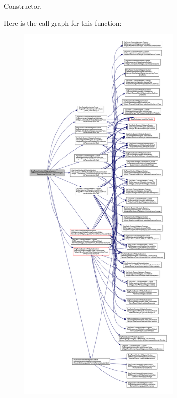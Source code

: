 \begin{DoxyVerb}Constructor.\end{DoxyVerb}
 Here is the call graph for this function\+:
\nopagebreak
\begin{figure}[H]
\begin{center}
\leavevmode
\includegraphics[height=550pt]{class_dsg_tools_1_1_custom_widgets_1_1_custom_db_management_widgets_1_1new_domain_widget_1_1_new_domain_widget_a44731719f99462b989f6d3872b9265c9_cgraph}
\end{center}
\end{figure}



